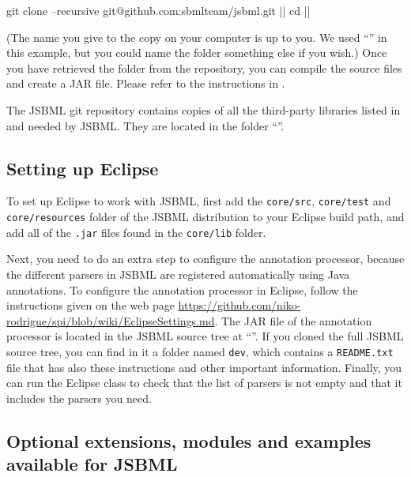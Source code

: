 \newcommand{\dirname}{\code{\emph{\bfseries\color{winered}jsbml}}\xspace}

\begin{example}[style=bash, title={Downloading the latest JSBML 
    sources from the JSBML project's GitHub repository.}]
git clone --recursive git@github.com:sbmlteam/jsbml.git |\dirname|
cd |\dirname|
\end{example}

(The name you give to the copy on your computer is up to you.  We used
``\dirname'' in this example, but you could name the folder something else
if you wish.)  Once you have retrieved the folder from the
repository, you can compile the source files and create a JAR file.  Please
refer to the instructions in .

The JSBML git repository contains copies of all the third-party libraries
listed in  and needed by JSBML.  They are
located in the folder ``\dirname''.


\subsection{Setting up Eclipse}
\label{sec:SettingUpEclipse}

To set up Eclipse to work with JSBML, first add the \texttt{core/src},
\texttt{core/test} and \texttt{core/resources} folder of the JSBML distribution to your
Eclipse build path, and add all of the \texttt{.jar} files found in the
\texttt{core/lib} folder.

Next, you need to do an extra step to configure the annotation processor,
because the different parsers in JSBML are registered automatically using
Java annotations.  To configure the annotation processor in Eclipse, follow
the instructions given on the web page
\url{https://github.com/niko-rodrigue/spi/blob/wiki/EclipseSettings.md}.
 The JAR file of the annotation processor is located in the JSBML source tree at
 ``\dirname''. If you cloned
the full JSBML source tree, you can find in it a folder named \texttt{dev}, which 
contains a \texttt{README.txt} file that has also these instructions and other
important information.
Finally, you can run the Eclipse  class to check that the list of
parsers is not empty and that it includes the parsers you need.


\subsection{Optional extensions, modules and examples available for JSBML}
\label{sec:dependencies}

